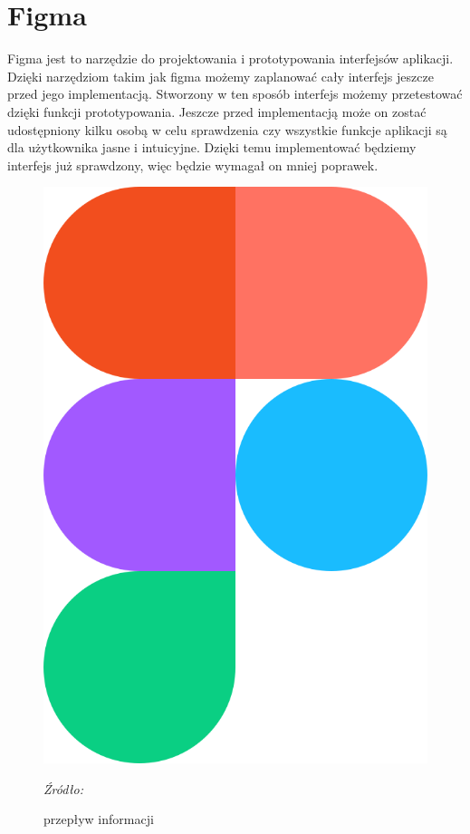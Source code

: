 \documentclass[12pt,twoside]{report}
\begin{document}
\section{Figma}
Figma jest to narzędzie do projektowania i prototypowania interfejsów aplikacji. Dzięki narzędziom takim jak figma możemy zaplanować cały interfejs jeszcze przed jego implementacją.  Stworzony w ten sposób interfejs możemy przetestować dzięki funkcji prototypowania. Jeszcze przed implementacją może on zostać udostępniony kilku osobą w celu sprawdzenia czy wszystkie funkcje aplikacji są dla użytkownika jasne i intuicyjne. Dzięki temu implementować będziemy interfejs już sprawdzony, więc będzie wymagał on mniej poprawek.
\begin{figure}[H]
	\centering
	\includegraphics[scale=0.15]{FigmaLogo}
	\caption{przepływ informacji}
	\textit{Źródło: \cite{FigmaIcon}}
	\label{FigmaLogo}
\end{figure}
\end{document}
